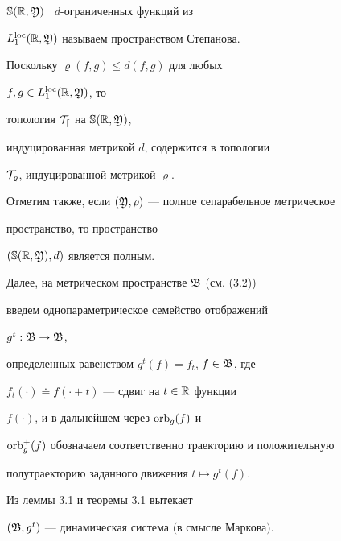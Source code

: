 $\Bbb S(\Bbb R,\frak Y)$ \ $d$-ограниченных функций из


$L_1^{\operatorname{loc}}(\Bbb R,\frak Y)$ называем пространством Степанова.


Поскольку $\varrho(f,g)\le d(f,g)$ для любых


$f,g\in L_1^{\operatorname{loc}}(\Bbb R,\frak Y)$, то


топология $\cal T_d$ на $\Bbb S(\Bbb R,\frak Y)$,


индуцированная метрикой $d$, содержится в топологии


$\cal T_\varrho$, индуцированной метрикой $\varrho$.


Отметим также, если $(\frak Y,\rho)$ --- полное сепарабельное метрическое


пространство, то пространство


$(\Bbb S(\Bbb R,\frak Y),d)$ является полным.





Далее, на метрическом пространстве $\frak B$ (см. (3.2))


введем однопараметрическое семейство отображений


$g^{t}:\frak B\to\frak B$,


определенных равенством $g^t(f)=f_t$, $f\in\frak B$, где


$f_t(\cdot)\doteq f(\cdot+t)$ --- сдвиг на $t\in\Bbb R$ функции


$f(\cdot)$, и в дальнейшем через $\operatorname{orb}_g(f)$ и


$\operatorname{orb}_g^+(f)$ обозначаем соответственно траекторию и положительную


полутраекторию заданного движения $t\mapsto g^{t}(f)$.





Из леммы 3.1 и теоремы 3.1 вытекает








\begin{thms}


$(\frak B,g^{t})$ --- динамическая система $($в смысле Маркова\/$)$.


\end{thms}








